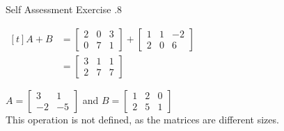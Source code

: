 \documentclass[\main/notes.tex]{subfiles}
\begin{document}
\begin{exercise}{Self Assessment Exercise \thechapter.8}
\begin{questions}
\begin{multicols}{2}
\begin{questions}
									\begin{answer}
										$ \begin{aligned}[t]
											A + B &= \begin{bmatrix}
												2 & 0 & 3 \\ 0 & 7 & 1
											\end{bmatrix} + \begin{bmatrix}
												1 & 1 & -2 \\ 2 & 0 & 6
											\end{bmatrix}\\
											&= \begin{bmatrix}
												3 & 1 & 1 \\ 2 & 7 & 7
											\end{bmatrix}
										\end{aligned} $
									\end{answer}
								\item $A = \begin{bmatrix}3 & 1\\ -2 & -5\end{bmatrix}$ and $B = \begin{bmatrix}1 & 2 & 0 \\ 2 & 5 & 1\end{bmatrix}$\\
									{\answer This operation is not defined, as the matrices are different sizes.}
							\end{questions}
						\end{multicols}
					\end{questions}
				\end{exercise}
\end{document}
